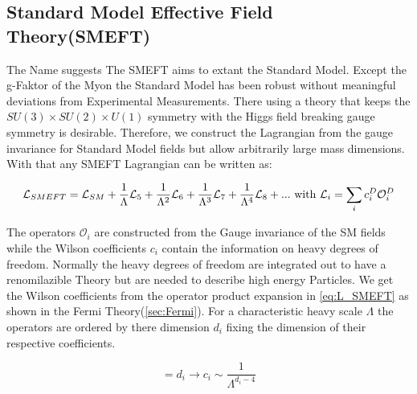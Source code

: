 \documentclass[../Bachelorarbeit.tex]{subfiles}
\begin{document}
\subsection{Standard Model Effective Field Theory(SMEFT)}
The Name suggests The SMEFT aims to extant the Standard Model.
Except the g-Faktor of the Myon the Standard Model has been robust without meaningful deviations from Experimental Measurements. 
There using a theory that keeps the $SU(3) \times SU(2) \times U(1)$ symmetry with the Higgs field breaking gauge symmetry is desirable.
Therefore, we construct the Lagrangian from the gauge invariance for Standard Model fields but allow arbitrarily large mass dimensions. 
With that any SMEFT Lagrangian can be written as:

\begin{equation}
    \mathcal{L}_{SMEFT} = \mathcal{L}_{SM} + \frac{1}{\Lambda} \mathcal{L}_{5} + \frac{1}{\Lambda^2} \mathcal{L}_{6} + \frac{1}{\Lambda^3} \mathcal{L}_{7} + \frac{1}{\Lambda^4} \mathcal{L}_{8} + ... \textnormal{ with } \mathcal{L}_{i} = \sum_{i} c_{i}^{D} \mathcal{O}_{i}^{D}
    \label{eq:L_SMEFT}
\end{equation}

The operators $\mathcal{O}_{i}$ are constructed from the Gauge invariance of the SM fields while the Wilson coefficients $c_{i}$ contain the information on heavy degrees of freedom.
Normally the heavy degrees of freedom are integrated out to have a renomilazible Theory but are needed to describe high energy Particles.
We get the Wilson coefficients from the operator product expansion in \ref{eq:L_SMEFT} as shown in the Fermi Theory(\ref{sec:Fermi}).
For a characteristic heavy scale $\Lambda$ the operators are ordered by there dimension $d_{i}$ fixing the dimension of their respective coefficients.

\begin{equation}
    [\mathcal{O}_i] = d_{i} \longrightarrow c_{i} \sim \frac{1}{\Lambda^{d_{i}-4}}
\end{equation}
\end{document}

